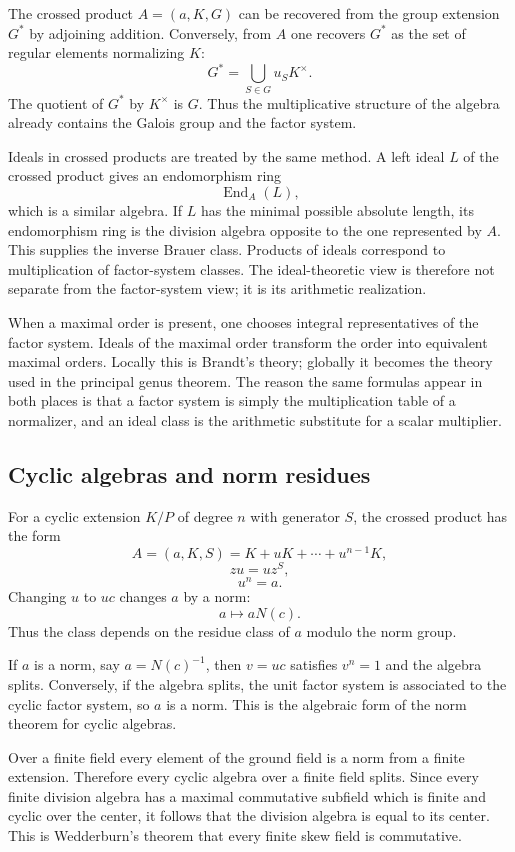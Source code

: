 \documentclass[11pt]{article}
\begin{document}
The crossed product \(A=(a,K,G)\) can be recovered from the group extension \(G^*\) by adjoining addition. Conversely, from \(A\) one recovers \(G^*\) as the set of regular elements normalizing \(K\):
\[
  G^*=\bigcup_{S\in G}u_SK^{\times}.
\]
The quotient of \(G^*\) by \(K^{\times}\) is \(G\). Thus the multiplicative structure of the algebra already contains the Galois group and the factor system.

Ideals in crossed products are treated by the same method. A left ideal \(L\) of the crossed product gives an endomorphism ring
\[
  \operatorname{End}_A(L),
\]
which is a similar algebra. If \(L\) has the minimal possible absolute length, its endomorphism ring is the division algebra opposite to the one represented by \(A\). This supplies the inverse Brauer class. Products of ideals correspond to multiplication of factor-system classes. The ideal-theoretic view is therefore not separate from the factor-system view; it is its arithmetic realization.

When a maximal order is present, one chooses integral representatives of the factor system. Ideals of the maximal order transform the order into equivalent maximal orders. Locally this is Brandt's theory; globally it becomes the theory used in the principal genus theorem. The reason the same formulas appear in both places is that a factor system is simply the multiplication table of a normalizer, and an ideal class is the arithmetic substitute for a scalar multiplier.

\subsection{Cyclic algebras and norm residues}

For a cyclic extension \(K/P\) of degree \(n\) with generator \(S\), the crossed product has the form
\[
  A=(a,K,S)=K+uK+\cdots+u^{n-1}K,
\]
\[
  zu=uz^S,
\]
\[
  u^n=a.
\]
Changing \(u\) to \(uc\) changes \(a\) by a norm:
\[
  a\mapsto aN(c).
\]
Thus the class depends on the residue class of \(a\) modulo the norm group.

If \(a\) is a norm, say \(a=N(c)^{-1}\), then \(v=uc\) satisfies \(v^n=1\) and the algebra splits. Conversely, if the algebra splits, the unit factor system is associated to the cyclic factor system, so \(a\) is a norm. This is the algebraic form of the norm theorem for cyclic algebras.

Over a finite field every element of the ground field is a norm from a finite extension. Therefore every cyclic algebra over a finite field splits. Since every finite division algebra has a maximal commutative subfield which is finite and cyclic over the center, it follows that the division algebra is equal to its center. This is Wedderburn's theorem that every finite skew field is commutative.
\end{document}
